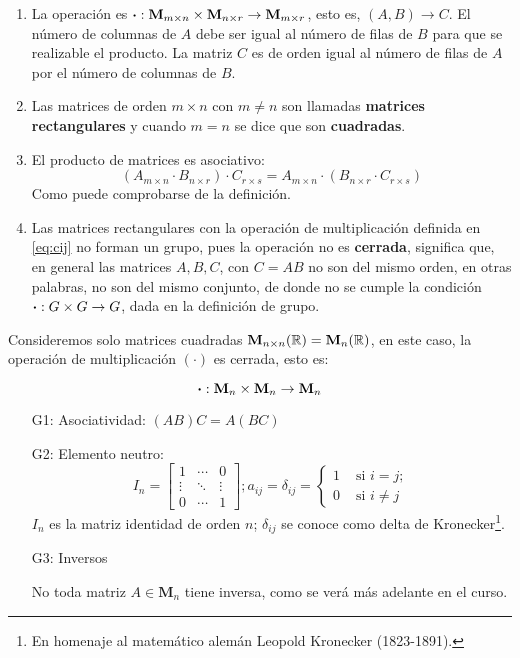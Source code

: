 \begin{enumerate}[label=\roman*)]
	\item La operación es $\boldsymbol{\cdot} : \textbf{M}_{m \times n} \times \mathbf{M}_{n \times r} \rightarrow \mathbf{M}_{m \times r}$, esto es, $(A, B) \rightarrow C$. El número de columnas de $A$ debe ser igual al número de filas de $B$ para que se realizable el producto. La matriz $C$ es de orden igual al número de filas de $A$ por el número de columnas de $B$.
	
	\item Las matrices de orden $m\times n$ con $m \ne n$ son llamadas \textbf{matrices rectangulares} y cuando $m = n$ se dice que son \textbf{cuadradas}.
	
	\item El producto de matrices es asociativo: \[(A_{m\times n} \cdot B_{n \times r}) \cdot C_{r \times s} = A_{m \times n} \cdot (B_{n \times r} \cdot C_{r \times s})\] Como puede comprobarse de la definición.
	
	\item Las matrices rectangulares con la operación de multiplicación definida en \eqref{eq:cij} no forman un grupo, pues la operación no es \textbf{cerrada}, significa que, en general las matrices $A, B, C$, con $C = AB$ no son del mismo orden, en otras palabras, no son del mismo conjunto, de donde no se cumple la condición $\boldsymbol{\cdot}: G \times G \rightarrow G$, dada en la definición de grupo.
\end{enumerate}

Consideremos solo matrices cuadradas $\mathbf{M}_{n \times n}(\mathbb{R}) = \mathbf{M}_n(\mathbb{R})$, en este caso, la operación de multiplicación $(\cdot)$ es cerrada, esto es:

\[ \boldsymbol{\cdot}: \mathbf{M}_n \times \mathbf{M}_n \rightarrow \mathbf{M}_n\]

\begin{itemize}
	\item[G1:] Asociatividad: $(AB)C = A(BC)$ \quad \cmark
	\item[G2:] Elemento neutro: \quad \cmark
	\[I_n = \begin{bmatrix}
		1 & \cdots & 0\\
		\vdots & \ddots & \vdots\\
		0 & \cdots & 1 
	\end{bmatrix}; a_{ij} = \delta_{ij} = \begin{cases} 1 & \mbox{ si } i = j;\\ 0 & \mbox{ si } i \ne j \end{cases} \] $I_n$ es la matriz identidad de orden $n$; $\delta_{ij}$ se conoce como delta de Kronecker\footnote{En homenaje al matemático alemán Leopold Kronecker (1823-1891).}.
	\item[G3:] Inversos \quad \xmark
	
	No toda matriz $A \in \mathbf{M}_n$ tiene inversa, como se verá más adelante en el curso.
\end{itemize}

